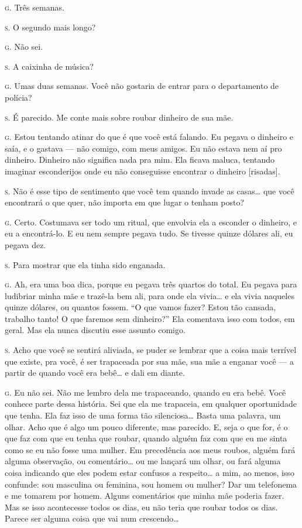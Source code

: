 \noindent\hskip0mm\textsc{g.} Três semanas.

\noindent\hskip0mm\textsc{s.} O segundo mais longo?

\noindent\hskip0mm\textsc{g.} Não sei.

\noindent\hskip0mm\textsc{s.} A caixinha de música?

\noindent\hskip0mm\textsc{g.} Umas duas semanas. Você não gostaria de entrar para o departamento de
polícia?

\noindent\hskip0mm\textsc{s.} É parecido. Me conte mais sobre roubar dinheiro de sua mãe.

\noindent\hskip0mm\textsc{g.} Estou tentando atinar do que é que você está falando. Eu pegava o
dinheiro e saía, e o gastava --- não comigo, com meus amigos. Eu não
estava nem aí pro dinheiro. Dinheiro não significa nada pra mim. Ela
ficava maluca, tentando imaginar esconderijos onde eu não conseguisse
encontrar o dinheiro [risadas].

\noindent\hskip0mm\textsc{s.} Não é esse tipo de sentimento que você tem quando invade as casas\ldots{}
que você encontrará o que quer, não importa em que lugar o tenham
posto?

\noindent\hskip0mm\textsc{g.} Certo. Costumava ser todo um ritual, que envolvia ela a esconder o
dinheiro, e eu a encontrá-lo. E eu nem sempre pegava tudo. Se tivesse
quinze dólares ali, eu pegava dez.

\noindent\hskip0mm\textsc{s.} Para mostrar que ela tinha sido enganada.

\noindent\hskip0mm\textsc{g.} Ah, era uma boa dica, porque eu pegava três quartos do total. Eu
pegava para ludibriar minha mãe e trazê-la bem ali, para onde ela
vivia\ldots{} e ela vivia naqueles quinze dólares, ou quantos fossem.
``O que vamos fazer? Estou tão cansada, trabalho tanto! O
que faremos sem dinheiro?'' Ela comentava isso com todos,
em geral. Mas ela nunca discutiu esse assunto comigo.

\noindent\hskip0mm\textsc{s.} Acho que você se sentirá aliviada, se puder se lembrar que a coisa
mais terrível que existe, pra você, é ser trapaceada por sua mãe, sua
mãe a enganar você --- a partir de quando você era bebê\ldots{} e dali em
diante.

\noindent\hskip0mm\textsc{g.} Eu não sei. Não me lembro dela me trapaceando, quando eu era bebê.
Você conhece parte dessa história. Sei que ela me trapaceia, em
qualquer oportunidade que tenha. Ela faz isso de uma forma tão
silenciosa\ldots{} Basta uma palavra, um olhar. Acho que é algo um pouco
diferente, mas parecido. E, seja o que for, é o que faz com que eu
tenha que roubar, quando alguém faz com que eu me sinta como se eu não
fosse uma mulher. Em precedência aos meus roubos, alguém fará alguma
observação, ou comentário\ldots{} ou me lançará um olhar, ou fará alguma
coisa indicando que eles podem estar confusos a respeito\ldots{} a mim, ao
menos, isso confunde: sou masculina ou feminina, sou homem ou mulher?
Dar um telefonema e me tomarem por homem. Alguns comentários que minha
mãe poderia fazer. Mas se isso acontecesse todos os dias, eu não teria
que roubar todos os dias. Parece ser alguma coisa que vai num
crescendo\ldots{}

